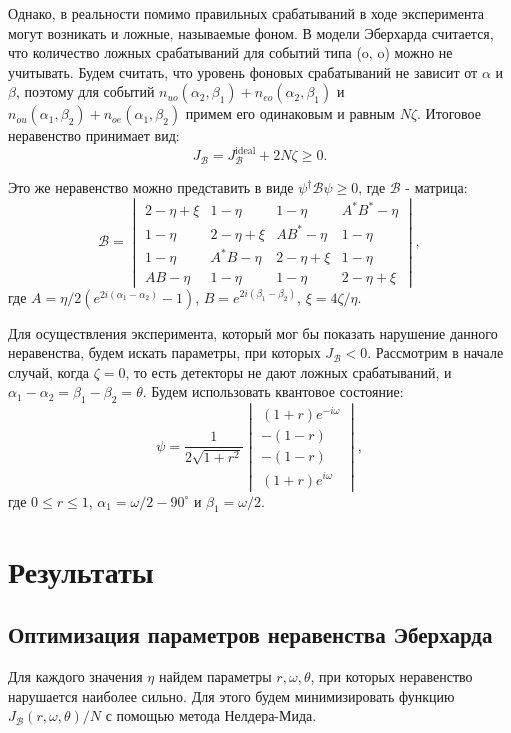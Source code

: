 \documentclass[%
master,         %
subf,           %
href,           %
colorlinks=true %
]{disser}
\numberwithin{equation}{section}
\numberwithin{figure}{section}
\begin{document}
Однако, в реальности помимо правильных срабатываний в ходе эксперимента могут возникать и ложные, называемые фоном. В модели Эберхарда считается, что количество ложных срабатываний для событий типа (o, o) можно не учитывать. Будем считать, что уровень фоновых срабатываний не зависит от $\alpha$ и $\beta$, поэтому для событий $n_{uo}(\alpha_2, \beta_1) + n_{eo}(\alpha_2, \beta_1)$ и $n_{ou}(\alpha_1, \beta_2) + n_{oe}(\alpha_1, \beta_2)$ примем его одинаковым и равным $N\zeta$. Итоговое неравенство принимает вид:
\[
J_{\mathcal{B}} = J_{\mathcal{B}}^{\mbox{ideal}} + 2N\zeta \geq 0.
\]

Это же неравенство можно представить в виде $\psi^\dagger\mathcal{B}\psi \geq 0$, где $\mathcal{B}$ - матрица:
\[
\mathcal{B} = 
\begin{vmatrix}
2 - \eta + \xi & 1 - \eta & 1 - \eta & A^*B^* - \eta\\
1 - \eta & 2 - \eta + \xi & AB^* - \eta & 1 - \eta\\
1 - \eta & A^*B - \eta & 2 - \eta + \xi & 1 - \eta\\
AB - \eta & 1 - \eta & 1 - \eta & 2 - \eta + \xi
\end{vmatrix},
\]
где $A = \eta/2(e^{2i(\alpha_1-\alpha_2)} - 1)$, $B = e^{2i(\beta_1 - \beta_2)}$, $\xi = 4\zeta/\eta$.

Для осуществления эксперимента, который мог бы показать нарушение данного неравенства, будем искать параметры, при которых $J_{\mathcal{B}} < 0$. Рассмотрим в начале случай, когда $\zeta = 0$, то есть детекторы не дают ложных срабатываний, и $\alpha_1 - \alpha_2 = \beta_1 - \beta_2 = \theta$. Будем использовать квантовое состояние:
\[
\psi = \frac{1}{2\sqrt{1 + r^2}}
\begin{vmatrix}
(1+r)e^{-i\omega}\\
-(1 - r)\\
-(1 - r)\\
(1 + r)e^{i\omega}
\end{vmatrix},
\]
где $0 \leq r \leq 1$, $\alpha_1 = \omega / 2 - 90^\circ$ и $\beta_1 = \omega / 2$.

\chapter{Результаты}

\section{Оптимизация параметров неравенства Эберхарда}
Для каждого значения $\eta$ найдем параметры $r, \omega, \theta$, при которых неравенство нарушается наиболее сильно. Для этого будем минимизировать функцию $J_{\mathcal{B}}(r, \omega, \theta) / N$ с помощью метода Нелдера-Мида. 
\end{document}
